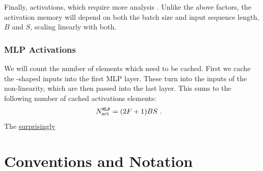 \documentclass[11pt]{article}
\begin{document}
Finally, activations, which require more analysis \cite{korthikanti2022reducing}. Unlike the above
factors, the activation memory will depend on both the batch size and input sequence length, $ B $
and $ S $, scaling linearly with both.

\subsubsection{MLP Activations}

We will count the number of elements which need to be cached.  First we cache the
-shaped inputs into the first MLP layer. These turn into the
 inputs of the non-linearity, which are then passed into the last
 layer. This sums to the following number of cached activations elements:
\begin{align}
N _{ \rm act  } ^\texttt{MLP} &= (2F+1)BS \ .
\end{align}
The
\href{https://github.com/pytorch/pytorch/issues/41571}{surprisingly}











\appendix


\section{Conventions and Notation}\label{app_conventions}
\end{document}
